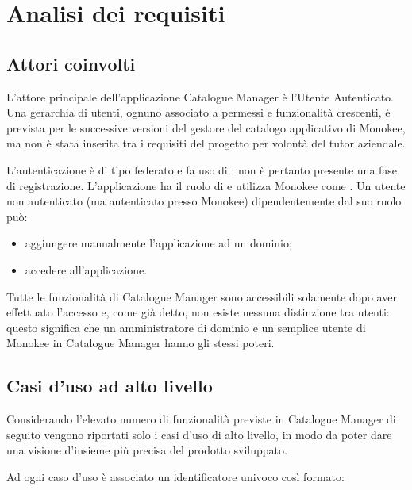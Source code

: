 \chapter{Analisi dei requisiti}\label{adr}
\section{Attori coinvolti}
L'attore principale dell'applicazione Catalogue Manager è l'Utente Autenticato. Una gerarchia di utenti, ognuno associato a permessi e funzionalità crescenti, è prevista per le successive versioni del gestore del catalogo applicativo di Monokee, ma non è stata inserita tra i requisiti del progetto per volontà del tutor aziendale. 

L'autenticazione è di tipo federato e fa uso di : non è pertanto presente una fase di registrazione. L'applicazione ha il ruolo di  e utilizza Monokee come . Un utente non autenticato (ma autenticato presso Monokee) dipendentemente dal suo ruolo può:
\begin{itemize}
\item aggiungere manualmente l'applicazione ad un dominio;
\item accedere all'applicazione.
\end{itemize}
Tutte le funzionalità di Catalogue Manager sono accessibili solamente dopo aver effettuato l'accesso e, come già detto, non esiste nessuna distinzione tra utenti: questo significa che un amministratore di dominio e un semplice utente di Monokee in Catalogue Manager hanno gli stessi poteri.

\section{Casi d'uso ad alto livello}
Considerando l'elevato numero di funzionalità previste in Catalogue Manager di seguito vengono riportati solo i casi d'uso di alto livello, in modo da poter dare una visione d'insieme più precisa del prodotto sviluppato.

Ad ogni caso d'uso è associato un identificatore univoco così formato:

